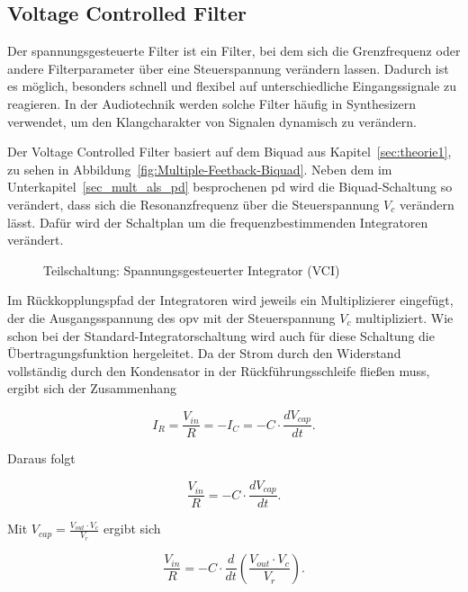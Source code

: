 \documentclass[../main.tex]{subfiles}
\begin{document}
\subsection{Voltage Controlled Filter}
Der spannungsgesteuerte Filter ist ein Filter, bei dem sich die Grenzfrequenz oder andere Filterparameter über eine Steuerspannung verändern lassen. Dadurch ist es möglich, besonders schnell und flexibel auf unterschiedliche Eingangssignale zu reagieren. In der Audiotechnik werden solche Filter häufig in Synthesizern verwendet, um den Klangcharakter von Signalen dynamisch zu verändern.\cite{vcf_wiki}\par
\medskip

Der Voltage Controlled Filter basiert auf dem Biquad aus Kapitel~\ref{sec:theorie1}, zu sehen in Abbildung~\ref{fig:Multiple-Feetback-Biquad}. Neben dem im Unterkapitel~\ref{sec_mult_als_pd} besprochenen \gls{pd} wird die Biquad-Schaltung so verändert, dass sich die Resonanzfrequenz über die Steuerspannung $V_c$ verändern lässt. Dafür wird der Schaltplan um die frequenzbestimmenden Integratoren verändert.

\begin{figure}[!h]
  \centering
  \resizebox{0.6\textwidth}{!}{}
  \caption{Teilschaltung: Spannungsgesteuerter Integrator (VCI)}
  \label{fig:sb_vci}
\end{figure}

Im Rückkopplungspfad der Integratoren wird jeweils ein Multiplizierer eingefügt, der die Ausgangsspannung des \gls{opv} mit der Steuerspannung $V_c$ multipliziert. Wie schon bei der Standard-Integratorschaltung wird auch für diese Schaltung die Übertragungsfunktion hergeleitet. Da der Strom durch den Widerstand vollständig durch den Kondensator in der Rückführungsschleife fließen muss, ergibt sich der Zusammenhang

\begin{equation}
    I_R = \frac{V_{in}}{R} = -I_C = -C \cdot \frac{dV_{cap}}{dt}.
\label{eq:integrator_current}
\end{equation}

Daraus folgt

\begin{equation}
\frac{V_{in}}{R} = -C \cdot \frac{dV_{cap}}{dt}.
\label{eq:integrator_relation}
\end{equation}

Mit $V_{cap} = \frac{V_{out} \cdot V_c}{V_r}$ ergibt sich

\begin{equation}
  \frac{V_{in}}{R} = -C \cdot \frac{d}{dt}\left(\frac{V_{out} \cdot V_c}{V_r}\right).
\end{equation}
\end{document}
